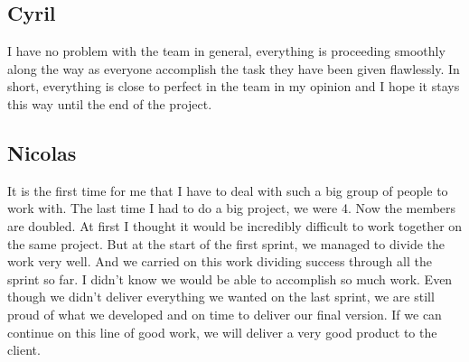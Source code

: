 \subsection{Cyril}

I have no problem with the team in general, everything is proceeding
smoothly along the way as everyone accomplish the task they have been given
flawlessly. In short, everything is close to perfect in the team in my
opinion and I hope it stays this way until the end of the project.

\subsection{Nicolas}

It is the first time for me that I have to deal with such a big group of
people to work with. The last time I had to do a big project, we were 4.
Now the members are doubled. At first I thought it would be incredibly
difficult to work together on the same project. But at the start of the
first sprint, we managed to divide the work very well. And we carried on
this work dividing success through all the sprint so far. I didn't know we
would be able to accomplish so much work. Even though we didn't deliver
everything we wanted on the last sprint, we are still proud of what we
developed and on time to deliver our final version. If we can continue on
this line of good work, we will deliver a very good product to the client.
